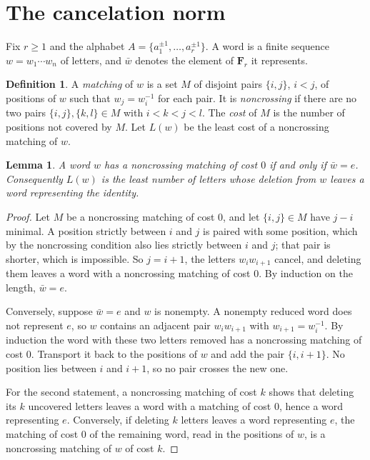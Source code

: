 \documentclass[11pt]{amsart}
\newtheorem{lemma}[theorem]{Lemma}
\theoremstyle{definition}
\newtheorem{definition}[theorem]{Definition}
\theoremstyle{remark}
\numberwithin{equation}{section}
\newcommand{\F}{\mathbf F}
\begin{document}
\section{The cancelation norm}\label{sec:norm}

Fix $r\ge1$ and the alphabet $A=\{a_1^{\pm1},\dots,a_r^{\pm1}\}$. A word is a finite sequence $w=w_1\cdots w_n$ of letters, and $\bar w$ denotes the element of $\F_r$ it represents.

\begin{definition}
A \emph{matching} of $w$ is a set $M$ of disjoint pairs $\{i,j\}$, $i<j$, of positions of $w$ such that $w_j=w_i^{-1}$ for each pair. It is \emph{noncrossing} if there are no two pairs $\{i,j\},\{k,l\}\in M$ with $i<k<j<l$. The \emph{cost} of $M$ is the number of positions not covered by $M$. Let $L(w)$ be the least cost of a noncrossing matching of $w$.
\end{definition}

\begin{lemma}\label{lem:trivial}
A word $w$ has a noncrossing matching of cost $0$ if and only if $\bar w=e$. Consequently $L(w)$ is the least number of letters whose deletion from $w$ leaves a word representing the identity.
\end{lemma}

\begin{proof}
Let $M$ be a noncrossing matching of cost $0$, and let $\{i,j\}\in M$ have $j-i$ minimal. A position strictly between $i$ and $j$ is paired with some position, which by the noncrossing condition also lies strictly between $i$ and $j$; that pair is shorter, which is impossible. So $j=i+1$, the letters $w_iw_{i+1}$ cancel, and deleting them leaves a word with a noncrossing matching of cost $0$. By induction on the length, $\bar w=e$.

Conversely, suppose $\bar w=e$ and $w$ is nonempty. A nonempty reduced word does not represent $e$, so $w$ contains an adjacent pair $w_iw_{i+1}$ with $w_{i+1}=w_i^{-1}$. By induction the word with these two letters removed has a noncrossing matching of cost $0$. Transport it back to the positions of $w$ and add the pair $\{i,i+1\}$. No position lies between $i$ and $i+1$, so no pair crosses the new one.

For the second statement, a noncrossing matching of cost $k$ shows that deleting its $k$ uncovered letters leaves a word with a matching of cost $0$, hence a word representing $e$. Conversely, if deleting $k$ letters leaves a word representing $e$, the matching of cost $0$ of the remaining word, read in the positions of $w$, is a noncrossing matching of $w$ of cost $k$.
\end{proof}
\end{document}
